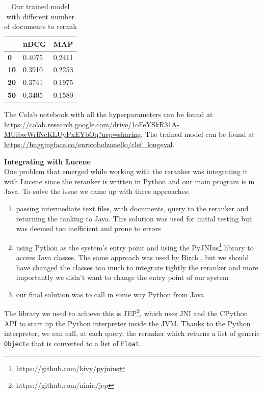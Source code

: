\begin{table}[tbp]
\caption{\label{tab:own-model}Our trained model with different number of documents to rerank}
\begin{tabular}{|l|l|l|}
\toprule
             & \textbf{nDCG} & \textbf{MAP} \\
\midrule
\textbf{0}   & 0.4075        & 0.2411       \\ 
\textbf{10}  & 0.3910         & 0.2253       \\ 
\textbf{20}  & 0.3741       & 0.1975       \\ 
\textbf{50}  & 0.3405        & 0.1580        \\ 
\bottomrule
\end{tabular}
\end{table}

\noindent The Colab notebook with all the hyperparameters can be found at \url{https://colab.research.google.com/drive/1oFeYSkR31A-MUibwWrfNcKLUyPxEYbOq?usp=sharing}.
The trained model can be found at \url{https://huggingface.co/enricobolzonello/clef_longeval}.

\noindent \textbf{Integrating with Lucene}\\
One problem that emerged while working with the reranker was integrating it with Lucene since the reranker is written in Python and our main program is in Java. To solve the issue we came up with three approaches: 
\begin{enumerate}
\item passing intermediate text files, with documents, query to the reranker and returning the ranking to Java. This solution was used for initial testing but was deemed too inefficient and prone to errors
\item using Python as the system's entry point and using the PyJNIus\footnote{https://github.com/kivy/pyjnius} library to access Java classes. The same approach was used by Birch \cite{Birch}, but we should have changed the classes too much to integrate tightly the reranker and more importantly we didn't want to change the entry point of our system 
\item our final solution was to call in some way Python from Java
\end{enumerate}
The library we used to achieve this is JEP\footnote{https://github.com/ninia/jep}, which uses \ac{JNI} and the CPython API to start up the Python interpreter inside the \ac{JVM}. Thanks to the Python interpreter, we can call, at each query, the reranker which returns a list of generic \texttt{Object}s that is converted to a list of \texttt{Float}.